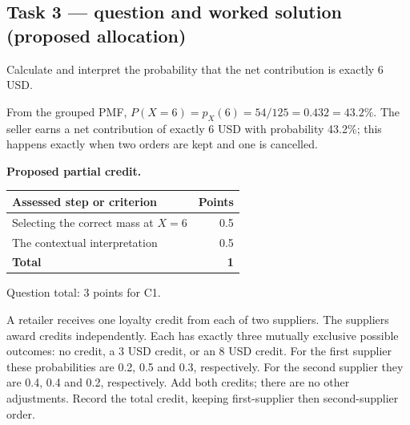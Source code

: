 \par\vspace{3mm}\secInicio[][sec:q1]

\subsection*{Task 3 --- question and worked solution (proposed allocation) }
\label{sol:q1t3}

Calculate and interpret the probability that the net contribution is exactly 6 USD.

From the grouped PMF, $P(X=6)=p_X(6)=54/125=0.432=43.2\%$. The seller earns a net contribution of exactly 6 USD with probability 43.2\%; this happens exactly when two orders are kept and one is cancelled.

\par\smallskip
\noindent\begin{minipage}{\linewidth}
\textbf{Proposed partial credit.}\par\smallskip
\begin{tabularx}{\linewidth}{@{}>{\raggedright\arraybackslash}X r@{}}\toprule
\textbf{Assessed step or criterion} & \textbf{Points}\\\midrule
Selecting the correct mass at $X=6$ & 0.5\\
The contextual interpretation & 0.5\\
\midrule
\textbf{Total} & \textbf{1}\\
\bottomrule\end{tabularx}
\end{minipage}\par\smallskip

Question total: 3 points for C1.

\par\vspace{3mm}\secInicio[][sec:q1]

\clearpage
{}

A retailer receives one loyalty credit from each of two suppliers. The suppliers award credits independently. Each has exactly three mutually exclusive possible outcomes: no credit, a 3 USD credit, or an 8 USD credit. For the first supplier these probabilities are 0.2, 0.5 and 0.3, respectively. For the second supplier they are 0.4, 0.4 and 0.2, respectively. Add both credits; there are no other adjustments. Record the total credit, keeping first-supplier then second-supplier order.

